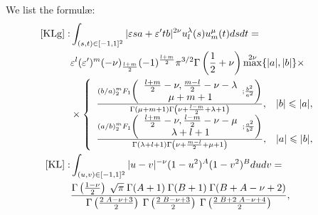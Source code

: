 \documentclass{article}
\newcommand{\tmop}[1]{\ensuremath{\operatorname{#1}}}
\begin{document}
We list the formul{\ae}:
\begin{eqnarray}
  {}[\tmop{KLg}] : & \int_{(s, t) \in [- 1, 1]^2} | \varepsilon s a +
  \varepsilon' t b |^{2 \nu} u_l^{\lambda} (s) u_m^{\mu} (t) d s d t = & 
  \nonumber\\
  & \varepsilon^l (\varepsilon')^m (- \nu)_{\frac{l + m}{2}} (- 1)^{\frac{l +
  m}{2}} \pi^{3 / 2} \Gamma \left( \frac{1}{2} + \nu \right) \max^{2 \nu} \{ |
  a |, | b | \} \times &  \nonumber\\
  & \times \left\{ \begin{array}{ll}
    \frac{(b / a)^m _2 F_1 \left( \begin{array}{c}
      \frac{l + m}{2} - \nu, \frac{m - l}{2} - \nu - \lambda\\
      \mu + m + 1
    \end{array} ; \frac{b^2}{a^2} \right)}{\Gamma (\mu + m + 1) \Gamma \left(
    \nu + \frac{l - m}{2} + \lambda + 1 \right)}, & | b | \leqslant | a |,\\
    \frac{(a / b)^m _2 F_1 \left( \begin{array}{c}
      \frac{l + m}{2} - \nu, \frac{l - m}{2} - \nu - \mu\\
      \lambda + l + 1
    \end{array} ; \frac{a^2}{b^2} \right)}{\Gamma (\lambda + l + 1) \Gamma
    \left( \nu + \frac{m - l}{2} + \mu + 1 \right)}, & | a | \leqslant | b |,
  \end{array} \right. &  \nonumber\\
  {}[\tmop{KL}] : & \int_{(u, v) \in [- 1, 1]^2} | u - v |^{- \nu} (1 - u^2)^A
  (1 - v^2)^B d u d v = &  \nonumber\\
  & \frac{\Gamma \left( \frac{1 - \nu}{2} \right) \hspace{0.25em} \sqrt{\pi} 
  \hspace{0.25em} \Gamma (A + 1)  \hspace{0.25em} \Gamma (B + 1) 
  \hspace{0.25em} \Gamma (B + A - \nu + 2)}{\Gamma \left( \frac{2
  \hspace{0.25em} A - \nu + 3}{2} \right)  \hspace{0.25em} \Gamma \left(
  \frac{2 \hspace{0.25em} B - \nu + 3}{2} \right)  \hspace{0.25em} \Gamma
  \left( \frac{2 \hspace{0.25em} B + 2 \hspace{0.25em} A - \nu + 4}{2}
  \right)}, &  \nonumber\\

\end{eqnarray}
\end{document}
